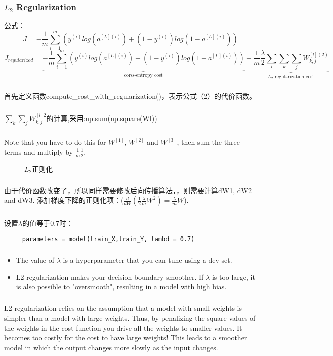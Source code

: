 \documentclass{article}
\begin{document}
\begin{CJK}{UTF8}{gbsn}
\subsubsection{$L_2$ Regularization}
公式：
\begin{equation}
J=-\frac{1}{m}\sum_{i=1}^m(y^{(i)}log(a^{[L](i)})+(1-y^{(i)})log(1-a^{[L](i)}))
\end{equation}
\begin{equation}
J_{regularized}=\underbrace{-\frac{1}{m}\sum_{i=1}^m(y^{(i)}log(a^{[L](i)})+(1-y^{(i)})log(1-a^{[L](i)}))}_\text{corss-entropy cost}+\underbrace{\frac{1}{m}\frac{\lambda}{2}\sum_l\sum_k\sum_jW_{k,j}^{[l](2)}}_\text{$L_2$ regularization cost}
\end{equation}
\subparagraph{}
首先定义函数compute\_{}cost\_{}with\_{}regularization()，表示公式（2）的代价函数。
\subparagraph{}
$\sum\limits_k\sum\limits_j W_{k,j}^{[l]2}$的计算,采用:np.sum(np.square(Wl))
\subparagraph{}
Note that you have to do this for $W^{[1]}$, $W^{[2]}$ and $W^{[3]}$, then sum the three terms and multiply by $\frac{1}{m}\frac{1}{2}$.
\begin{figure}[H]
\label{fig:21}
\caption{$L_2$正则化}
\end{figure}
\subparagraph{}
由于代价函数改变了，所以同样需要修改后向传播算法，，则需要计算dW1, dW2 and dW3. 添加梯度下降的正则化项：($\frac{d}{dW} ( \frac{1}{2}\frac{\lambda}{m}  W^2) = \frac{\lambda}{m} W$).
\subparagraph{}
设置$\lambda$的值等于0.7时：
    \begin{verbatim}
     parameters = model(train_X,train_Y, lambd = 0.7)
    \end{verbatim}
\subparagraph{}
\begin{itemize}
\item The value of $\lambda$ is a hyperparameter that you can tune using a dev set.
\item L2 regularization makes your decision boundary smoother. If $\lambda$ is too large, it is also possible to "oversmooth", resulting in a model with high bias.
\end{itemize}
\subparagraph{}
L2-regularization relies on the assumption that a model with small weights is simpler than a model with large weights. Thus, by penalizing the square values of the weights in the cost function you drive all the weights to smaller values. It becomes too costly for the cost to have large weights! This leads to a smoother model in which the output changes more slowly as the input changes.

\end{CJK}
\end{document}
